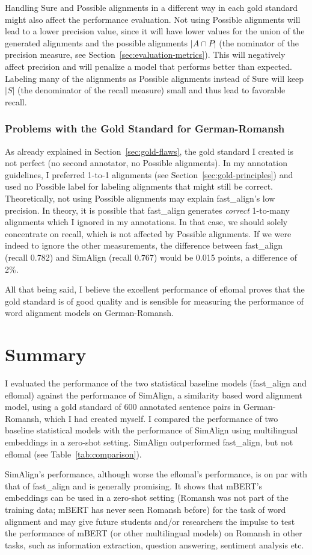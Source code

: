 Handling Sure and Possible alignments in a different way in each gold standard might also affect the performance evaluation. 
Not using Possible alignments will lead to a lower precision value, since it will have lower values for the union of the generated alignments and the possible alignments $|A \cap P|$ (the nominator of the precision measure, see Section~\ref{sec:evaluation-metrics}). This will negatively affect precision and will penalize a model that performs better than expected. 
Labeling many of the alignments as Possible alignments instead of Sure will keep $|S|$ (the denominator of the recall measure) small and thus lead to favorable recall. 


\subsubsection{Problems with the Gold Standard for German-Romansh}
As already explained in Section~\ref{sec:gold-flaws}, the gold standard I created is not perfect (no second annotator, no Possible alignments). 
In my annotation guidelines, I preferred 1-to-1 alignments (see Section~\ref{sec:gold-principles}) and used no Possible label for labeling alignments that might still be correct.
Theoretically, not using Possible alignments may explain fast\_align's low precision. 
In theory, it is possible that fast\_align generates \emph{correct} 1-to-many alignments which I ignored in my annotations. 
In that case, we should solely concentrate on recall, which is not affected by Possible alignments. 
If we were indeed to ignore the other measurements, the difference between fast\_align (recall 0.782) and SimAlign (recall 0.767) would be 0.015 points, a difference of 2\%.

All that being said, I believe the excellent performance of eflomal proves that the gold standard is of good quality and is sensible for measuring the performance of word alignment models on German-Romansh.
 
\section{Summary}
I evaluated the performance of the two statistical baseline models (fast\_align and eflomal)  against the performance of SimAlign, a similarity based word alignment model, using a gold standard of 600 annotated sentence pairs in German-Romansh, which I had created myself.
I compared the performance of two baseline statistical models with the performance of SimAlign using multilingual embeddings in a zero-shot setting. 
SimAlign outperformed fast\_align, but not eflomal (see Table~\ref{tab:comparison}). 

SimAlign's performance, although worse the eflomal's performance, is on par with that of fast\_align and is generally promising. 
It shows that mBERT's embeddings can be used in a zero-shot setting (Romansh was not part of the training data; mBERT has never seen Romansh before) for the task of word alignment and may give future students and/or researchers the impulse to test the performance of mBERT (or other multilingual models) on Romansh in other tasks, such as information extraction, question answering, sentiment analysis etc.




